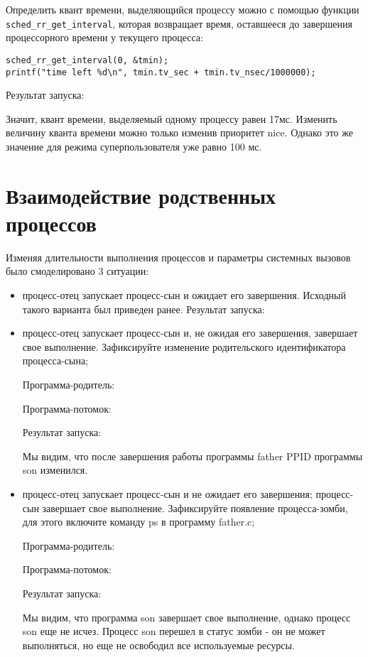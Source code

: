 \documentclass[a4paper]{article}
\begin{document}
	Определить квант времени, выделяющийся процессу можно с помощью функции \\\texttt{sched\_rr\_get\_interval}, которая возвращает время, оставшееся до завершения процессорного времени у текущего процесса:
	
	\begin{lstlisting}[style=crs_cpp]	
sched_rr_get_interval(0, &tmin);
printf("time left %d\n", tmin.tv_sec + tmin.tv_nsec/1000000);
	\end{lstlisting}
	
	Результат запуска:
	
	
	Значит, квант времени, выделяемый одному процессу равен 17мс. Изменить величину кванта времени можно только изменив приоритет nice.
	Однако это же значение для режима суперпользователя уже равно 100 мс.
\section{Взаимодействие родственных процессов}
	Изменяя длительности выполнения процессов и параметры системных вызовов было смоделировано 3 ситуации:
	\begin{itemize}
		\item процесс-отец запускает процесс-сын и ожидает его завершения. Исходный такого варианта был приведен ранее. Результат запуска:
	
	
		\item процесс-отец запускает процесс-сын и, не ожидая его завершения, завершает свое выполнение. Зафиксируйте изменение родительского идентификатора процесса-сына;
		
		Программа-родитель:
		

		
		Программа-потомок:
		


		Результат запуска:
		
	
		
		Мы видим, что после завершения работы программы father PPID программы son изменился.

		\item процесс-отец запускает процесс-сын и не ожидает его завершения; процесс-сын завершает свое выполнение. Зафиксируйте появление процесса-зомби, для этого включите команду ps в программу father.c;
		
		Программа-родитель:
		
		
		Программа-потомок:
		
	
		Результат запуска:
			
		
		Мы видим, что программа son завершает свое выполнение, однако процесс son еще не исчез. Процесс son перешел в статус зомби - он не может выполняться, но еще не освободил все используемые ресурсы.
	\end{itemize}
	
\end{document}

